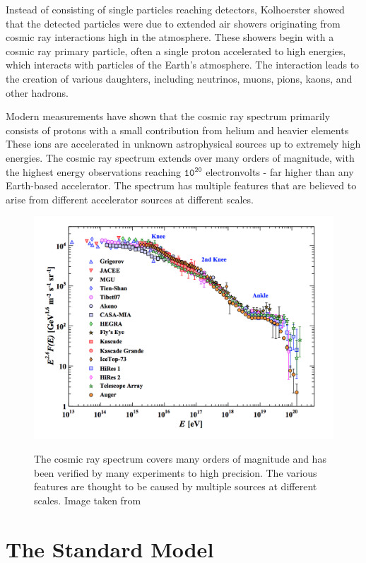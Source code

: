 Instead of consisting of single particles reaching detectors, Kolhoerster showed that the detected particles were due to extended air showers originating from cosmic ray interactions high in the atmosphere.
These showers begin with a cosmic ray primary particle, often a single proton accelerated to high energies, which interacts with particles of the Earth's atmosphere.
The interaction leads to the creation of various daughters, including neutrinos, muons, pions, kaons, and other hadrons.

Modern measurements have shown that the cosmic ray spectrum primarily consists of protons with a small contribution from helium and heavier elements \cite{PDG-2015}
These ions are accelerated in unknown astrophysical sources up to extremely high energies.
The cosmic ray spectrum extends over many orders of magnitude, with the highest energy observations reaching $\mathtt{10^{20}}$ electronvolts - far higher than any Earth-based accelerator.
The spectrum has multiple features that are believed to arise from different accelerator sources at different scales.

\begin{figure}
\centering
\includegraphics[width=0.9\linewidth]{CR_Spectrum_PDG15.png}
\label{fig:CR_spectrum}
\caption{The cosmic ray spectrum covers many orders of magnitude and has been verified by many experiments to high precision. The various features are thought to be caused by multiple sources at different scales. Image taken from \cite{PDG-2015}}
\end{figure}


\label{sec:standard_model}
\section{The Standard Model}

